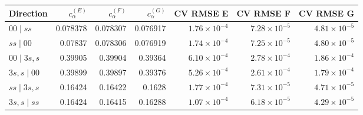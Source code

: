 \begin{tabular}{lrrrrrr}\toprule
Direction & $c_\alpha^{(E)}$ & $c_\alpha^{(F)}$ & $c_\alpha^{(G)}$ & CV RMSE E & CV RMSE F & CV RMSE G\\\midrule
$00\mid ss$ & 0.078378 & 0.078307 & 0.076917 & $1.76\!\times\!10^{-4}$ & $7.28\!\times\!10^{-5}$ & $4.81\!\times\!10^{-5}$\\
$ss\mid 00$ & 0.07837 & 0.078306 & 0.076919 & $1.74\!\times\!10^{-4}$ & $7.25\!\times\!10^{-5}$ & $4.80\!\times\!10^{-5}$\\
$00\mid 3s,s$ & 0.39905 & 0.39904 & 0.39364 & $6.10\!\times\!10^{-4}$ & $2.78\!\times\!10^{-4}$ & $1.86\!\times\!10^{-4}$\\
$3s,s\mid 00$ & 0.39899 & 0.39897 & 0.39376 & $5.26\!\times\!10^{-4}$ & $2.61\!\times\!10^{-4}$ & $1.79\!\times\!10^{-4}$\\
$ss\mid 3s,s$ & 0.16424 & 0.16422 & 0.1628 & $1.77\!\times\!10^{-4}$ & $7.31\!\times\!10^{-5}$ & $4.71\!\times\!10^{-5}$\\
$3s,s\mid ss$ & 0.16424 & 0.16415 & 0.16288 & $1.07\!\times\!10^{-4}$ & $6.18\!\times\!10^{-5}$ & $4.29\!\times\!10^{-5}$\\
\bottomrule\end{tabular}
